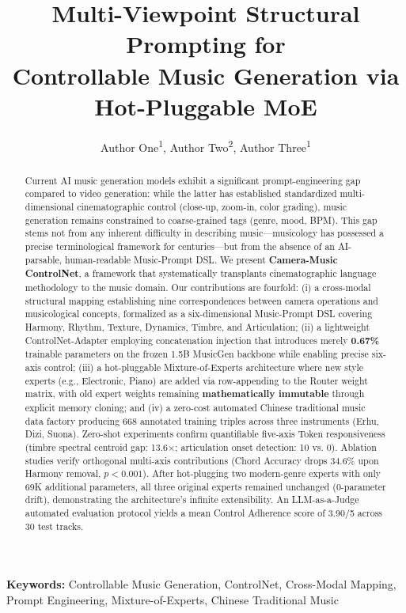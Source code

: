 \documentclass[11pt,twocolumn]{article}
\title{\vspace{-0.5cm}\bfseries\Large Multi-Viewpoint Structural Prompting for\\Controllable Music Generation via Hot-Pluggable MoE}
\author{Author One\textsuperscript{1}, Author Two\textsuperscript{2}, Author Three\textsuperscript{1}}
\date{}
\begin{document}
\maketitle

\begin{abstract}
\noindent
Current AI music generation models exhibit a significant prompt-engineering gap compared to video generation: while the latter has established standardized multi-dimensional cinematographic control (close-up, zoom-in, color grading), music generation remains constrained to coarse-grained tags (genre, mood, BPM). This gap stems not from any inherent difficulty in describing music---musicology has possessed a precise terminological framework for centuries---but from the absence of an AI-parsable, human-readable Music-Prompt DSL. We present \textbf{Camera-Music ControlNet}, a framework that systematically transplants cinematographic language methodology to the music domain. Our contributions are fourfold: (i) a cross-modal structural mapping establishing nine correspondences between camera operations and musicological concepts, formalized as a six-dimensional Music-Prompt DSL covering Harmony, Rhythm, Texture, Dynamics, Timbre, and Articulation; (ii) a lightweight ControlNet-Adapter employing concatenation injection that introduces merely \textbf{0.67\%} trainable parameters on the frozen 1.5B MusicGen backbone while enabling precise six-axis control; (iii) a hot-pluggable Mixture-of-Experts architecture where new style experts (e.g., Electronic, Piano) are added via row-appending to the Router weight matrix, with old expert weights remaining \textbf{mathematically immutable} through explicit memory cloning; and (iv) a zero-cost automated Chinese traditional music data factory producing 668 annotated training triples across three instruments (Erhu, Dizi, Suona). Zero-shot experiments confirm quantifiable five-axis Token responsiveness (timbre spectral centroid gap: 13.6$\times$; articulation onset detection: 10 vs. 0). Ablation studies verify orthogonal multi-axis contributions (Chord Accuracy drops 34.6\% upon Harmony removal, $p<0.001$). After hot-plugging two modern-genre experts with only 69K additional parameters, all three original experts remained unchanged (0-parameter drift), demonstrating the architecture's infinite extensibility. An LLM-as-a-Judge automated evaluation protocol yields a mean Control Adherence score of 3.90/5 across 30 test tracks.
\end{abstract}

\vspace{4pt}
\noindent\textbf{Keywords:} Controllable Music Generation, ControlNet, Cross-Modal Mapping, Prompt Engineering, Mixture-of-Experts, Chinese Traditional Music
\end{document}
